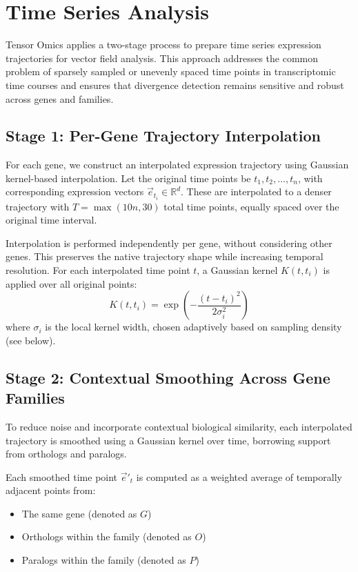 \section{Time Series Analysis}\label{sec:time_series_smoothing}

    Tensor Omics applies a two-stage process to prepare time series expression trajectories for vector field analysis. This approach addresses the common problem of sparsely sampled or unevenly spaced time points in transcriptomic time courses and ensures that divergence detection remains sensitive and robust across genes and families.

    \subsection{Stage 1: Per-Gene Trajectory Interpolation}

        For each gene, we construct an interpolated expression trajectory using Gaussian kernel-based interpolation. Let the original time points be \( t_1, t_2, \dots, t_n \), with corresponding expression vectors \( \vec{e}_{t_i} \in \mathbb{R}^d \). These are interpolated to a denser trajectory with \( T = \max(10n, 30) \) total time points, equally spaced over the original time interval.

        Interpolation is performed independently per gene, without considering other genes. This preserves the native trajectory shape while increasing temporal resolution. For each interpolated time point \( t \), a Gaussian kernel \( K(t, t_i) \) is applied over all original points:
        \[
            K(t, t_i) = \exp\left( -\frac{(t - t_i)^2}{2\sigma_i^2} \right)
        \]
        where \( \sigma_i \) is the local kernel width, chosen adaptively based on sampling density (see below).

    \subsection{Stage 2: Contextual Smoothing Across Gene Families}

        To reduce noise and incorporate contextual biological similarity, each interpolated trajectory is smoothed using a Gaussian kernel over time, borrowing support from orthologs and paralogs.

        Each smoothed time point \( \vec{e}'_t \) is computed as a weighted average of temporally adjacent points from:
        \begin{itemize}
            \item The same gene (denoted as \( G \))
            \item Orthologs within the family (denoted as \( O \))
            \item Paralogs within the family (denoted as \( P \))
        \end{itemize}

